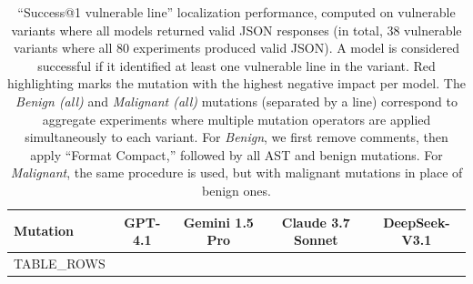 \begin{table}[htbp]
\centering
\small
\caption{%
``Success@1 vulnerable line'' localization performance, computed on vulnerable variants where all models returned valid JSON responses (in total, 38 vulnerable variants where all 80 experiments produced valid JSON). 
A model is considered successful if it identified at least one vulnerable line in the variant. 
Red highlighting marks the mutation with the highest negative impact per model. 
The \emph{Benign (all)} and \emph{Malignant (all)} mutations (separated by a line) correspond to aggregate experiments where multiple mutation operators are applied simultaneously to each variant. 
For \emph{Benign}, we first remove comments, then apply ``Format Compact,'' followed by all AST and benign mutations. 
For \emph{Malignant}, the same procedure is used, but with malignant mutations in place of benign ones.
}
\label{tab:mutation_impact}
\begin{tabular}{lcccc}
\toprule
\textbf{Mutation} & \textbf{GPT-4.1} & \textbf{Gemini 1.5 Pro} & \textbf{Claude 3.7 Sonnet} & \textbf{DeepSeek-V3.1} \\
\midrule
{TABLE_ROWS}
\bottomrule
\end{tabular}
\end{table}